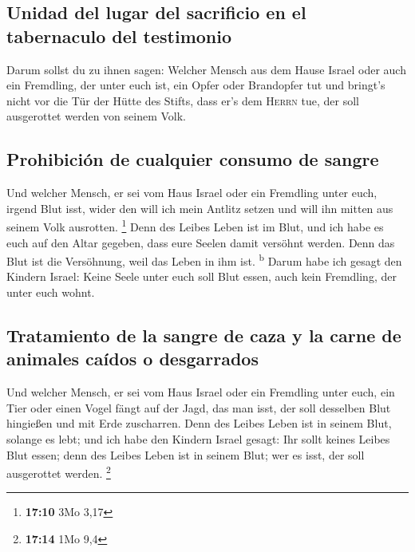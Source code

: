 \hypertarget{unidad-del-lugar-del-sacrificio-en-el-tabernaculo-del-testimonio}{%
\subsection{Unidad del lugar del sacrificio en el tabernaculo del
testimonio}\label{unidad-del-lugar-del-sacrificio-en-el-tabernaculo-del-testimonio}}

 Darum sollst du zu ihnen sagen: Welcher Mensch aus dem
Hause Israel oder auch ein Fremdling, der unter euch ist, ein Opfer oder
Brandopfer tut  und bringt's nicht vor die Tür der Hütte
des Stifts, dass er's dem \textsc{Herrn} tue, der soll ausgerottet
werden von seinem Volk.

\hypertarget{prohibiciuxf3n-de-cualquier-consumo-de-sangre}{%
\subsection{Prohibición de cualquier consumo de
sangre}\label{prohibiciuxf3n-de-cualquier-consumo-de-sangre}}

 Und welcher Mensch, er sei vom Haus Israel oder ein
Fremdling unter euch, irgend Blut isst, wider den will ich mein Antlitz
setzen und will ihn mitten aus seinem Volk ausrotten. \footnote{\textbf{17:10}
  3Mo 3,17}  Denn des Leibes Leben ist im Blut, und ich
habe es euch auf den Altar gegeben, dass eure Seelen damit versöhnt
werden. Denn das Blut ist die Versöhnung, weil das Leben in ihm ist.
\textsuperscript{b}  Darum habe ich gesagt den Kindern
Israel: Keine Seele unter euch soll Blut essen, auch kein Fremdling, der
unter euch wohnt.

\hypertarget{tratamiento-de-la-sangre-de-caza-y-la-carne-de-animales-cauxeddos-o-desgarrados}{%
\subsection{Tratamiento de la sangre de caza y la carne de animales
caídos o
desgarrados}\label{tratamiento-de-la-sangre-de-caza-y-la-carne-de-animales-cauxeddos-o-desgarrados}}

 Und welcher Mensch, er sei vom Haus Israel oder ein
Fremdling unter euch, ein Tier oder einen Vogel fängt auf der Jagd, das
man isst, der soll desselben Blut hingießen und mit Erde zuscharren.
 Denn des Leibes Leben ist in seinem Blut, solange es
lebt; und ich habe den Kindern Israel gesagt: Ihr sollt keines Leibes
Blut essen; denn des Leibes Leben ist in seinem Blut; wer es isst, der
soll ausgerottet werden. \footnote{\textbf{17:14} 1Mo 9,4}

